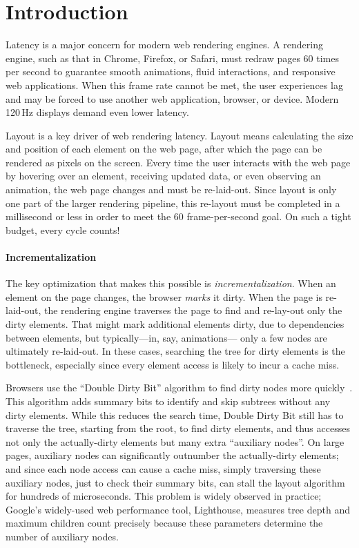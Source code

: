 \section{Introduction}

Latency is a major concern for modern web rendering engines.
A rendering engine, such as that in Chrome, Firefox, or Safari,
  must redraw pages 60 times per second
  to guarantee smooth animations, fluid interactions,
  and responsive web applications.
When this frame rate cannot be met,
  the user experiences lag and may be forced to use another web application, browser, or device.
Modern 120\,Hz displays demand even lower latency.

Layout is a key driver of web rendering latency.
Layout means calculating the size and position
  of each element on the web page,
  after which the page can be rendered as pixels on the screen.
Every time the user interacts with the web page
  by hovering over an element,
  receiving updated data,
  or even observing an animation,
  the web page changes
   and must be re-laid-out.
Since layout is only one part of the larger rendering pipeline,
  this re-layout must be completed in a millisecond or less
  in order to meet the 60 frame-per-second goal.
On such a tight budget, every cycle counts!

\paragraph{Incrementalization}
The key optimization that makes this possible
  is \emph{incrementalization}.
When an element on the page changes,
  the browser \emph{marks} it dirty.
When the page is re-laid-out,
  the rendering engine traverses the page
  to find and re-lay-out only the dirty elements.
That might mark additional elements dirty,
  due to dependencies between elements,
  but typically---in, say, animations---%
  only a few nodes are ultimately re-laid-out.
In these cases, searching the tree
  for dirty elements is the bottleneck,
  especially since every element access
  is likely to incur a cache miss.

Browsers use the ``Double Dirty Bit'' algorithm
  to find dirty nodes more quickly~\cite{wbe,tali-garseil}.
This algorithm adds summary bits
  to identify and skip subtrees without any dirty elements.
While this reduces the search time,
  Double Dirty Bit still has to traverse the tree,
  starting from the root, to find dirty elements,
  and thus accesses not only the actually-dirty elements
  but many extra ``auxiliary nodes''.
On large pages,
  auxiliary nodes can significantly outnumber
  the actually-dirty elements;
  and since each node access can cause a cache miss,
  simply traversing these auxiliary nodes,
  just to check their summary bits,
  can stall the layout algorithm for hundreds of microseconds.
This problem is widely observed in practice;
  Google's widely-used web performance tool, Lighthouse,
  measures tree depth and maximum children count
  precisely because these parameters
  determine the number of auxiliary nodes.

